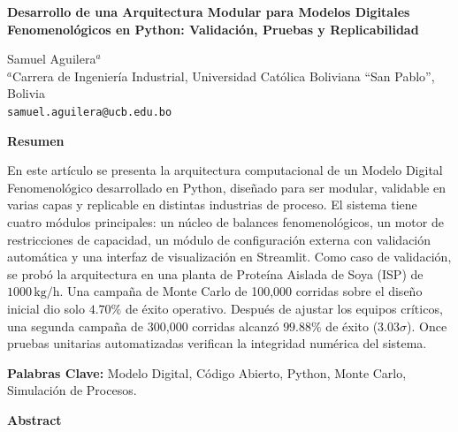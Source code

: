 \documentclass[10pt,letterpaper]{article}
\begin{document}
\thispagestyle{empty}

\begin{center}
    {\fontsize{16}{19}\selectfont\bfseries Desarrollo de una Arquitectura Modular para Modelos Digitales Fenomenol\'ogicos en Python: Validaci\'on, Pruebas y Replicabilidad} \par\vspace{0.8\baselineskip}
    {\fontsize{10}{12}\selectfont Samuel Aguilera$^{a}$} \\
    {\fontsize{9}{11}\selectfont $^{a}$Carrera de Ingenier\'ia Industrial, Universidad Cat\'olica Boliviana ``San Pablo'', Bolivia} \\
    {\fontsize{9}{11}\selectfont \texttt{samuel.aguilera@ucb.edu.bo}} \par\vspace{0.8\baselineskip}
\end{center}

\begin{center}
    {\fontsize{12}{14}\selectfont\bfseries Resumen}
\end{center}

En este art\'iculo se presenta la arquitectura computacional de un Modelo Digital Fenomenol\'ogico desarrollado en Python, dise\~nado para ser modular, validable en varias capas y replicable en distintas industrias de proceso. El sistema tiene cuatro m\'odulos principales: un n\'ucleo de balances fenomenol\'ogicos, un motor de restricciones de capacidad, un m\'odulo de configuraci\'on externa con validaci\'on autom\'atica y una interfaz de visualizaci\'on en Streamlit. Como caso de validaci\'on, se prob\'o la arquitectura en una planta de Prote\'ina Aislada de Soya (ISP) de $1000\,\text{kg/h}$. Una campa\~na de Monte Carlo de 100,000 corridas sobre el dise\~no inicial dio solo $4.70\%$ de \'exito operativo. Despu\'es de ajustar los equipos cr\'iticos, una segunda campa\~na de 300,000 corridas alcanz\'o $99.88\%$ de \'exito ($3.03\sigma$). Once pruebas unitarias automatizadas verifican la integridad num\'erica del sistema.

\vspace{6pt}
{\fontsize{10}{12}\selectfont\bfseries Palabras Clave:} Modelo Digital, C\'odigo Abierto, Python, Monte Carlo, Simulaci\'on de Procesos.

\vspace{12pt}

\begin{center}
    {\fontsize{12}{14}\selectfont\bfseries Abstract}
\end{center}
\end{document}
